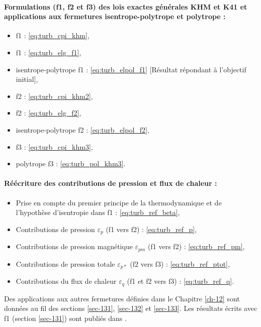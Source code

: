 {\begin{minipage}[c]{\linewidth}
\paragraph{Formulations (f1, f2 et f3) des lois exactes générales KHM et K41 et applications aux fermetures isentrope-polytrope et polytrope :} 
\begin{itemize}
    \item {} f1 :  \eqref{eq:turb_cpi_khm},
    \item {} f1 :  \eqref{eq:turb_elg_f1},
    \item {} isentrope-polytrope f1 :  \eqref{eq:turb_elpol_f1} [Résultat répondant à l'objectif initial],
    \item {} f2 :  \eqref{eq:turb_cpi_khm2},
    \item {} f2 :  \eqref{eq:turb_elg_f2},
    \item {} isentrope-polytrope f2 :  \eqref{eq:turb_elpol_f2},
    \item {} f3 :  \eqref{eq:turb_cpi_khm3},
    \item {} polytrope f3 :  \eqref{eq:turb_pol_khm3}.
\end{itemize}

\paragraph{Réécriture des contributions de pression et flux de chaleur :}
\begin{itemize}
    \item Prise en compte du premier principe de la thermodynamique et de l'hypothèse d'isentropie dans f1 :  \eqref{eq:turb_ref_beta},
    \item Contributions de pression $\varepsilon_p$ (f1 vers f2) : \eqref{eq:turb_ref_p},
    \item Contributions de pression magnétique $\varepsilon_{pm}$ (f1 vers f2) : \eqref{eq:turb_ref_pm},
    \item Contributions de pression totale $\varepsilon_{p*}$ (f2 vers f3) : \eqref{eq:turb_ref_ptot},
    \item Contributions du flux de chaleur $\varepsilon_{q}$ (f1 et f2 vers f3) : \eqref{eq:turb_ref_q}.\\
\end{itemize}

Des applications aux autres fermetures définies dans le Chapitre \ref{ch-12} sont données au fil des sections \ref{sec-131}, \ref{sec-132} et \ref{sec-133}.
Les résultats écrits avec f1 (section \ref{sec-131}) sont publiés dans \cite{simon_general_2021}. 
\end{minipage}}


 
